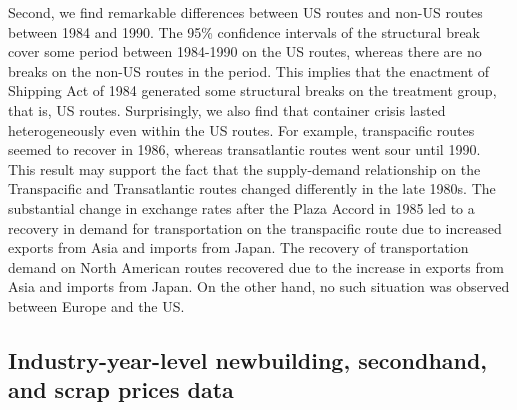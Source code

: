 \documentclass[11pt]{article}
\begin{document}
Second, we find remarkable differences between US routes and non-US routes between 1984 and 1990. The 95\% confidence intervals of the structural break cover some period between 1984-1990 on the US routes, whereas there are no breaks on the non-US routes in the period. This implies that the enactment of Shipping Act of 1984 generated some structural breaks on the treatment group, that is, US routes. Surprisingly, we also find that container crisis lasted heterogeneously even within the US routes. For example, transpacific routes seemed to recover in 1986, whereas transatlantic routes went sour until 1990. This result may support the fact that the supply-demand relationship on the Transpacific and Transatlantic routes changed differently in the late 1980s. The substantial change in exchange rates after the Plaza Accord in 1985 led to a recovery in demand for transportation on the transpacific route due to increased exports from Asia and imports from Japan. The recovery of transportation demand on North American routes recovered due to the increase in exports from Asia and imports from Japan. On the other hand, no such situation was observed between Europe and the US.





\subsection{Industry-year-level newbuilding, secondhand, and scrap prices data}
\end{document}
